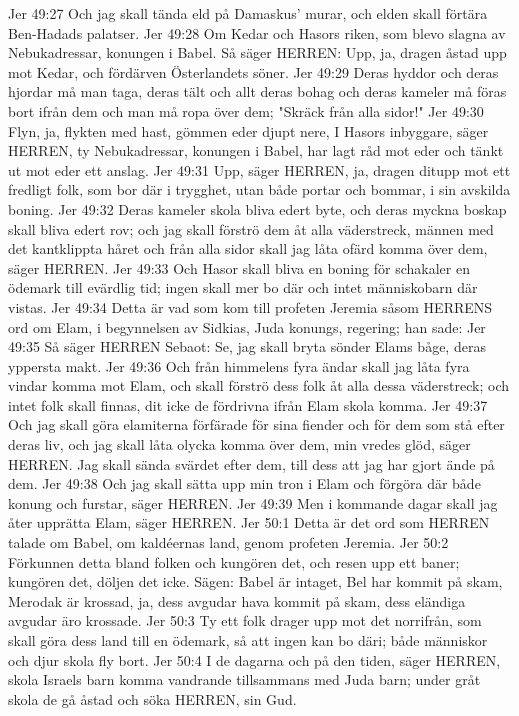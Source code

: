Jer 49:27  Och jag skall tända eld på Damaskus' murar, och elden skall förtära Ben-Hadads palatser.
Jer 49:28  Om Kedar och Hasors riken, som blevo slagna av Nebukadressar, konungen i Babel. Så säger HERREN: Upp, ja, dragen åstad upp mot Kedar, och fördärven Österlandets söner.
Jer 49:29  Deras hyddor och deras hjordar må man taga, deras tält och allt deras bohag och deras kameler må föras bort ifrån dem och man må ropa över dem; "Skräck från alla sidor!"
Jer 49:30  Flyn, ja, flykten med hast, gömmen eder djupt nere, I Hasors inbyggare, säger HERREN, ty Nebukadressar, konungen i Babel, har lagt råd mot eder och tänkt ut mot eder ett anslag.
Jer 49:31  Upp, säger HERREN, ja, dragen ditupp mot ett fredligt folk, som bor där i trygghet, utan både portar och bommar, i sin avskilda boning.
Jer 49:32  Deras kameler skola bliva edert byte, och deras myckna boskap skall bliva edert rov; och jag skall förströ dem åt alla väderstreck, männen med det kantklippta håret och från alla sidor skall jag låta ofärd komma över dem, säger HERREN.
Jer 49:33  Och Hasor skall bliva en boning för schakaler en ödemark till evärdlig tid; ingen skall mer bo där och intet människobarn där vistas.
Jer 49:34  Detta är vad som kom till profeten Jeremia såsom HERRENS ord om Elam, i begynnelsen av Sidkias, Juda konungs, regering; han sade:
Jer 49:35  Så säger HERREN Sebaot: Se, jag skall bryta sönder Elams båge, deras yppersta makt.
Jer 49:36  Och från himmelens fyra ändar skall jag låta fyra vindar komma mot Elam, och skall förströ dess folk åt alla dessa väderstreck; och intet folk skall finnas, dit icke de fördrivna ifrån Elam skola komma.
Jer 49:37  Och jag skall göra elamiterna förfärade för sina fiender och för dem som stå efter deras liv, och jag skall låta olycka komma över dem, min vredes glöd, säger HERREN. Jag skall sända svärdet efter dem, till dess att jag har gjort ände på dem.
Jer 49:38  Och jag skall sätta upp min tron i Elam och förgöra där både konung och furstar, säger HERREN.
Jer 49:39  Men i kommande dagar skall jag åter upprätta Elam, säger HERREN.
Jer 50:1  Detta är det ord som HERREN talade om Babel, om kaldéernas land, genom profeten Jeremia.
Jer 50:2  Förkunnen detta bland folken och kungören det, och resen upp ett baner; kungören det, döljen det icke. Sägen: Babel är intaget, Bel har kommit på skam, Merodak är krossad, ja, dess avgudar hava kommit på skam, dess eländiga avgudar äro krossade.
Jer 50:3  Ty ett folk drager upp mot det norrifrån, som skall göra dess land till en ödemark, så att ingen kan bo däri; både människor och djur skola fly bort.
Jer 50:4  I de dagarna och på den tiden, säger HERREN, skola Israels barn komma vandrande tillsammans med Juda barn; under gråt skola de gå åstad och söka HERREN, sin Gud.
